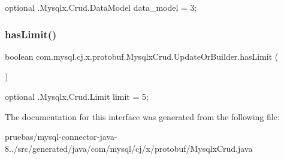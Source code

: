 {\ttfamily optional .Mysqlx.\+Crud.\+Data\+Model data\+\_\+model = 3;} \mbox{\label{interfacecom_1_1mysql_1_1cj_1_1x_1_1protobuf_1_1_mysqlx_crud_1_1_update_or_builder_acdc185b89f13b9925d0c43b9533be669}} 
\subsubsection{\texorpdfstring{has\+Limit()}{hasLimit()}}
{\footnotesize\ttfamily boolean com.\+mysql.\+cj.\+x.\+protobuf.\+Mysqlx\+Crud.\+Update\+Or\+Builder.\+has\+Limit (\begin{DoxyParamCaption}{ }\end{DoxyParamCaption})}

{\ttfamily optional .Mysqlx.\+Crud.\+Limit limit = 5;} 

The documentation for this interface was generated from the following file\+:\begin{DoxyCompactItemize}
\item 
pruebas/mysql-\/connector-\/java-\/8../src/generated/java/com/mysql/cj/x/protobuf/Mysqlx\+Crud.\+java\end{DoxyCompactItemize}
